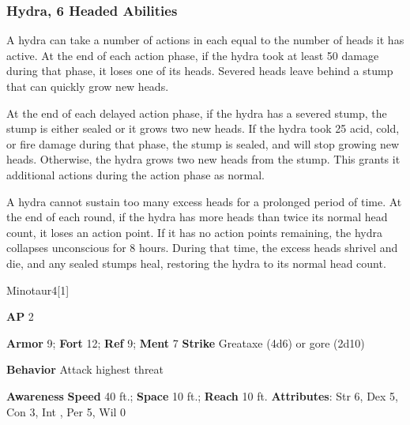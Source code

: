 \subsubsection{Hydra, 6 Headed Abilities}

A hydra can take a number of actions in each  equal to the number of heads it has active.
At the end of each action phase, if the hydra took at least 50 damage during that phase, it loses one of its heads.
Severed heads leave behind a stump that can quickly grow new heads.

At the end of each delayed action phase, if the hydra has a severed stump, the stump is either sealed or it grows two new heads.
If the hydra took 25 acid, cold, or fire damage during that phase, the stump is sealed, and will stop growing new heads.
Otherwise, the hydra grows two new heads from the stump.
This grants it additional actions during the action phase as normal.

A hydra cannot sustain too many excess heads for a prolonged period of time.
At the end of each round, if the hydra has more heads than twice its normal head count, it loses an action point.
If it has no action points remaining, the hydra collapses unconscious for 8 hours.
During that time, the excess heads shrivel and die, and any sealed stumps heal, restoring the hydra to its normal head count.





\begin{monsection}{Minotaur}{4}[1]
\vspace{-1em}\vspace{-1em}
\begin{spellcontent}
\begin{spelltargetinginfo}
{\textbf{AP} 2}

\pari \textbf{Armor} 9;
\textbf{Fort} 12;
\textbf{Ref} 9;
\textbf{Ment} 7
\pari \textbf{Strike} Greataxe  (4d6) or gore  (2d10)



\pari \textbf{Behavior} Attack highest threat
\end{spelltargetinginfo}
\end{spellcontent}

\begin{monsterfooter}
\pari \textbf{Awareness} 
\pari \textbf{Speed} 40 ft.;
\textbf{Space} 10 ft.;
\textbf{Reach} 10 ft.
\pari \textbf{Attributes}:
Str 6,
Dex 5,
Con 3,
Int ,
Per 5,
Wil 0
\end{monsterfooter}
\end{monsection}


